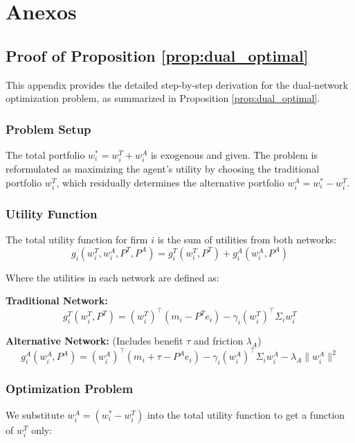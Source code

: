 \chapter{Anexos} 
\label{app:anexo_principal} %

\section{Proof of Proposition \ref{prop:dual_optimal}}
\label{app:derivacion_matematica} %

This appendix provides the detailed step-by-step derivation for the dual-network optimization problem, as summarized in Proposition \ref{prop:dual_optimal}.

\subsection{Problem Setup}
The total portfolio $w_i^* = w_i^T + w_i^A$ is exogenous and given. The problem is reformulated as maximizing the agent's utility by choosing the traditional portfolio $w_i^T$, which residually determines the alternative portfolio $w_i^A = w_i^* - w_i^T$.

\subsection{Utility Function}
The total utility function for firm $i$ is the sum of utilities from both networks:
\begin{equation}
g_i(w_i^T, w_i^A, P^T, P^A) = g_i^T(w_i^T, P^T) + g_i^A(w_i^A, P^A)
\end{equation}

Where the utilities in each network are defined as:

\textbf{Traditional Network:}
\begin{equation}
g_i^T(w_i^T, P^T) = (w_i^T)^\top(m_i - P^T e_i) - \gamma_i(w_i^T)^\top\Sigma_i w_i^T
\end{equation}

\textbf{Alternative Network:} (Includes benefit $\tau$ and friction $\lambda_A$)
\begin{equation}
g_i^A(w_i^A, P^A) = (w_i^A)^\top(m_i + \tau - P^A e_i) - \gamma_i(w_i^A)^\top\Sigma_i w_i^A - \lambda_A\|w_i^A\|^2
\end{equation}

\subsection{Optimization Problem}
We substitute $w_i^A = (w_i^* - w_i^T)$ into the total utility function to get a function of $w_i^T$ only:

